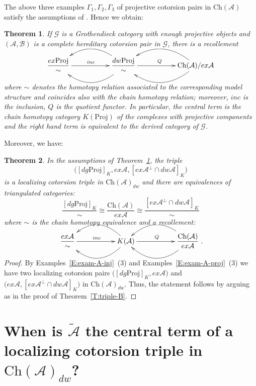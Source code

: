 \documentclass[11pt,a4paper,reqno]{amsart}
\newcommand{\A}{\mathcal{A}}
\newcommand{\B}{\mathcal{B}}
\newcommand{\G}{\mathcal{G}}
\newcommand{\Ch}{\mathrm{Ch}}
\newcommand{\Proj}{\mathrm{Proj}}
\theoremstyle{plain}
\newtheorem{thm}{Theorem}[section]
\theoremstyle{definition}
\theoremstyle{remark}
\begin{document}
 The above three examples $\Gamma_1, \Gamma_2, \Gamma_3$ of projective cotorsion pairs  in $\Ch(\A)$ satisfy the assumptions of \cite[Theorem 3.5]{G7}. Hence we obtain:
  \begin{thm}\label{T:recollement-proj-A} If $\G$ is a Grothendieck category with enough projective objects and $(\A, \B)$ is a complete hereditary cotorsion pair in $\G$, there is a recollement %
%



%
%
%
%
%
%
\vskip 0.7cm
\[
\xymatrix{\dfrac{ex \Proj}{\sim} \ar[rr]^{inc} &&\dfrac{dw\Proj}{\sim} \ar@/^2pc/
[ll]\ar@/_2pc/[ll] \ar[rr]^{Q}
&&{\Ch(\A)/ex\A}\ar@/^2pc/ [ll] \ar@/_2pc/ [ll] }
\]
\vskip 0.7cm

where $\sim$ denotes the homotopy relation associated to the corresponding model structure and coincides also with the chain homotopy relation; moreover, $inc$ is the inclusion, $Q$ is the quotient functor.  In particular, the central term is the chain homotopy category $K(\Proj)$ of the complexes with projective components and the right hand term is equivalent to the derived category of $\G$.
%
%
\end{thm}
%
%
%
%
%
Moreover, we have:
%

\begin{thm}\label{T:triple-A} In the assumptions of Theorem~\ref{T:recollement-proj-A}, the triple
\[\Big([dg\Proj]_K, ex\A, [ex\A{}^\perp{}\cap dw\A]_K\Big)\] is a localizing cotorsion triple in $\Ch(\A)_{dw}$ and there are equivalences of triangulated categories:
\[\frac{[dg\Proj]_K}{\sim} \cong \frac{\Ch(\A)}{ex\A} \cong  \frac{[ex\A{}^\perp{}\cap dw\A]_K}{\sim}\]
where $\sim$ is the chain homotopy equivalence
and a recollement:
\vskip0.7cm
\[
\xymatrix{\dfrac{ex\A}{\sim} \ar[rr]^{inc} &&{K(\A)} \ar@/^2pc/[ll]\ar@/_2pc/[ll] \ar[rr]^{Q}
&&{\dfrac{\Ch(\A)}{ex\A }}\ar@/^2pc/ [ll] \ar@/_2pc/ [ll] }
.\]
\vskip0.7cm
\end{thm}
\begin{proof} By Examples~\ref{E:exam-A-inj}~(3) and Examples~\ref{E:exam-A-proj}~(3)  we have two localizing cotorsion pairs $\Big([dg\Proj]_K, ex\A\Big)$ and $\Big(ex\A, [ex\A{}^\perp{}\cap dw\A]_K)$ in $\Ch(\A)_{dw}$.  Thus, the statement follows by arguing as in the proof of Theorem~\ref{T:triple-B}.
\end{proof}


\section{When is $\tilde{\A}$ the central term of a localizing cotorsion triple in $\Ch(\A)_{dw}$?}
%
%
\end{document}
